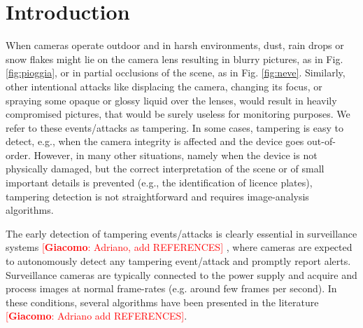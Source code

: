 \documentclass{llncs}
\newcommand{\gi}[1]{{\textcolor{red}{[\small \textbf{Giacomo}: #1]}}}
\begin{document}
\section{Introduction}\label{sec:introduction}


When cameras operate outdoor and in harsh environments, dust, rain drops or snow flakes might lie on the camera lens resulting in blurry pictures, as in Fig. \ref{fig:pioggia}, or in partial occlusions of the scene, as in Fig. \ref{fig:neve}. Similarly, other intentional attacks like displacing the camera, changing its focus, or spraying some opaque or glossy liquid over the lenses, would result in heavily compromised pictures, that would be surely useless for monitoring purposes. We refer to these events/attacks as tampering. In some cases, tampering is easy to detect, e.g., when the camera integrity is affected and the device goes out-of-order. However, in many other situations, namely when the device is not physically damaged,	 but the correct interpretation of the scene or of small important details is prevented (e.g., the identification of licence plates), tampering detection is not straightforward and requires image-analysis algorithms.

The early detection of tampering events/attacks is clearly essential in surveillance systems \gi{Adriano, add REFERENCES} \cite{hampapur2005smart}, where cameras are expected to autonomously detect any tampering event/attack and promptly report alerts. Surveillance cameras are typically connected to the power supply and acquire and process images at normal frame-rates (e.g. around few frames per second). In these conditions, several algorithms have been presented in the literature \gi{Adriano add REFERENCES}.  
\end{document}
